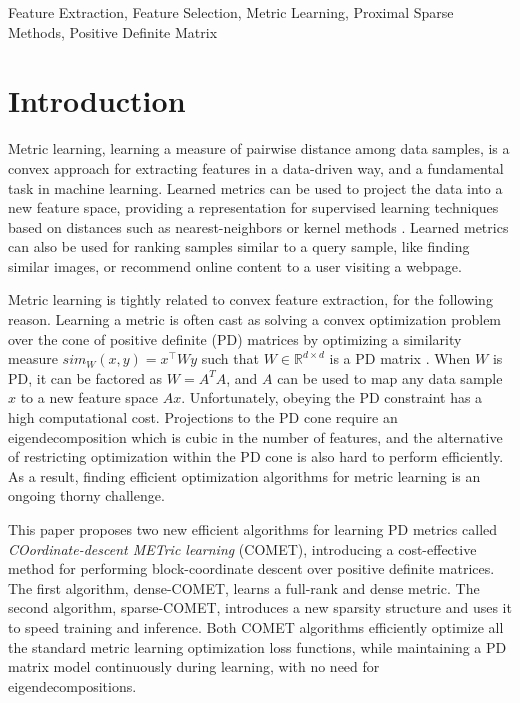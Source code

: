 \documentclass[twoside,11pt]{article}
\newcommand{\R}{\mathbb{R}}
\begin{document}
\begin{keywords}
  Feature Extraction, Feature Selection, Metric Learning, Proximal Sparse Methods, Positive Definite Matrix 
\end{keywords}

\section{Introduction}
Metric learning, learning a measure of pairwise distance among data samples, is a convex approach for extracting features in a data-driven way, and a fundamental task in machine learning. Learned metrics can be used to project the data into a new feature space, providing a representation for supervised learning techniques based on distances such as nearest-neighbors or kernel methods \citep{kulis2012survey}.
Learned metrics can also be used for ranking samples similar to a query sample, like finding similar images, or recommend online content to a user visiting a webpage. 

Metric learning is tightly related to convex feature extraction, for the following reason. Learning a metric is often cast as solving a convex optimization problem over the cone of positive definite (PD) matrices by optimizing a similarity measure $sim_W (x,y) = x^\top W y$ such that $W \in \R^{d \times d}$ is a PD matrix  \citep{kulis2012survey,bellet2013survey}. 
When $W$ is PD, it can be factored as $W= A^T A$, and $A$ can be used to map any data sample $x$ to a new feature space $Ax$. Unfortunately, obeying the PD constraint has a high computational cost. Projections to the PD cone require an eigendecomposition which is cubic in the number of features, and the alternative of restricting optimization within the PD cone is also hard to perform efficiently. As a result, finding efficient optimization algorithms for metric learning is an ongoing thorny challenge. 

This paper proposes two new efficient algorithms for learning PD metrics called {\em{COordinate-descent METric learning}} (COMET), introducing a cost-effective method for performing block-coordinate descent over positive definite matrices. The first algorithm, dense-COMET, learns a full-rank and dense metric. The second algorithm, sparse-COMET, introduces a new sparsity structure and uses it to speed training and inference. Both COMET algorithms  efficiently optimize all the standard metric learning optimization loss functions, while maintaining a PD matrix model continuously during learning, with no need for eigendecompositions. 
\end{document}
